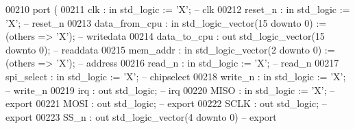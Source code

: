 \begin{DoxyCode}
00210         \textcolor{keywordflow}{port} (
00211             clk           : \textcolor{keywordflow}{in}  \textcolor{comment}{std\_logic}                     := 'X';             \textcolor{keyword}{-- clk}
00212             reset\_n       : \textcolor{keywordflow}{in}  \textcolor{comment}{std\_logic}                     := 'X';             \textcolor{keyword}{-- reset\_n}
00213             data\_from\_cpu : \textcolor{keywordflow}{in}  \textcolor{comment}{std\_logic\_vector}(\textcolor{vhdllogic}{}\textcolor{vhdllogic}{15} \textcolor{keywordflow}{downto} \textcolor{vhdllogic}{}\textcolor{vhdllogic}{0}) := (\textcolor{keywordflow}{others} => 'X'); \textcolor{keyword}{-- writedata}
00214             data\_to\_cpu   : \textcolor{keywordflow}{out} \textcolor{comment}{std\_logic\_vector}(\textcolor{vhdllogic}{}\textcolor{vhdllogic}{15} \textcolor{keywordflow}{downto} \textcolor{vhdllogic}{}\textcolor{vhdllogic}{0});                    \textcolor{keyword}{-- readdata}
00215             mem\_addr      : \textcolor{keywordflow}{in}  \textcolor{comment}{std\_logic\_vector}(\textcolor{vhdllogic}{}\textcolor{vhdllogic}{2} \textcolor{keywordflow}{downto} \textcolor{vhdllogic}{}\textcolor{vhdllogic}{0})  := (\textcolor{keywordflow}{others} => 'X'); \textcolor{keyword}{-- address}
00216             read\_n        : \textcolor{keywordflow}{in}  \textcolor{comment}{std\_logic}                     := 'X';             \textcolor{keyword}{-- read\_n}
00217             spi\_select    : \textcolor{keywordflow}{in}  \textcolor{comment}{std\_logic}                     := 'X';             \textcolor{keyword}{-- chipselect}
00218             write\_n       : \textcolor{keywordflow}{in}  \textcolor{comment}{std\_logic}                     := 'X';             \textcolor{keyword}{-- write\_n}
00219             irq           : \textcolor{keywordflow}{out} \textcolor{comment}{std\_logic};                                        \textcolor{keyword}{-- irq}
00220             MISO          : \textcolor{keywordflow}{in}  \textcolor{comment}{std\_logic}                     := 'X';             \textcolor{keyword}{-- export}
00221             MOSI          : \textcolor{keywordflow}{out} \textcolor{comment}{std\_logic};                                        \textcolor{keyword}{-- export}
00222             SCLK          : \textcolor{keywordflow}{out} \textcolor{comment}{std\_logic};                                        \textcolor{keyword}{-- export}
00223             SS\_n          : \textcolor{keywordflow}{out} \textcolor{comment}{std\_logic\_vector}(\textcolor{vhdllogic}{}\textcolor{vhdllogic}{4} \textcolor{keywordflow}{downto} \textcolor{vhdllogic}{}\textcolor{vhdllogic}{0})\textcolor{keyword}{                      -- export}

\end{DoxyCode}
